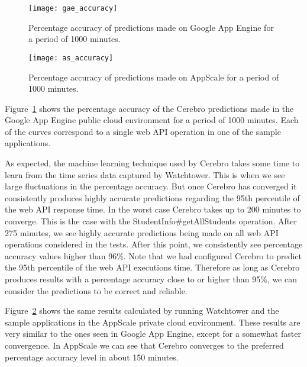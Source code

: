 \begin{figure}
\centering
\texttt{[image: gae\_accuracy]}
\caption{Percentage accuracy of predictions made on Google App Engine for a period of 1000 minutes.}
\label{fig:gae_accuracy}
\end{figure}

\begin{figure}
\centering
\texttt{[image: as\_accuracy]}
\caption{Percentage accuracy of predictions made on AppScale for a period of 1000 minutes.}
\label{fig:as_accuracy}
\end{figure}

Figure~\ref{fig:gae_accuracy} shows the percentage accuracy of the Cerebro predictions made in the Google App Engine 
public cloud environment for a period of 1000 minutes. Each of the curves correspond to a single web API operation in one of the 
sample applications. 

As expected, the machine learning technique used by Cerebro takes some time to learn
from the time series data captured by Watchtower. This is when we see large fluctuations in the percentage accuracy. But
once Cerebro has converged it consistently produces highly accurate predictions regarding the 95th percentile of the web API
response time. In the worst case Cerebro takes up to 200 minutes to converge. This is the case with the
StudentInfo\#getAllStudents operation. After 275 minutes, we see highly accurate predictions being made on all web API
operations considered in the tests. After this point, we consistently see percentage accuracy values higher than 96\%. Note that
we had configured Cerebro to predict the 95th percentile of the web API executions time. Therefore as long as Cerebro produces
results with a percentage accuracy close to or higher than 95\%, we can consider the predictions to be correct and reliable.

Figure~\ref{fig:as_accuracy} shows the same results calculated by running Watchtower and the sample applications in the AppScale private cloud
environment. These results are very similar to the ones seen in Google App Engine, except for a somewhat faster convergence. In AppScale
we can see that Cerebro converges to the preferred percentage accuracy level in about 150 minutes.

